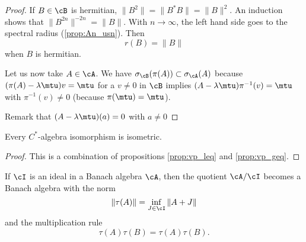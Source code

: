 \begin{proof}
If $B\in\cB$ is hermitian, $\|B^2\|=\|B^*B\|=\|B\|^2$. An induction shows that $\|B^{2n}\|^{-2n}=\|B\|$. With $n\to\infty$, the left hand side goes to the spectral radius (\ref{prop:An_usn}). Then 
\begin{equation}
r(B)=\|B\|
\end{equation}
when $B$ is hermitian.

Let us now take $A\in\cA$. We have $\sigma_{\cB}(\pi(A))\subset \sigma_{\cA}(A)$ because $(\pi(A)-\lambda\mtu)v=\mtu$ for a $v\neq 0$ in $\cB$ implies $(A-\lambda\mtu)\pi^{-1}(v)=\mtu$ with $\pi^{-1}(v)\neq 0$ (because $\pi(\mtu)=\mtu$).

Remark that $(A-\lambda\mtu)(a)=0$ with $a\neq 0$
\end{proof}

\begin{proposition}
    Every \( C^*\)-algebra isomorphism is isometric.
\end{proposition}

\begin{proof}
    This is a combination of propositions \ref{prop:vp_leq} and \ref{prop:vp_geq}.
\end{proof}

\begin{proposition} 
If $\cI$ is an ideal in a Banach algebra $\cA$, then the quotient $\cA/\cI$ becomes a Banach algebra with the norm
\begin{equation}  \label{eq:norm_ideal}
\|\tau(A)\|=\inf_{J\in\cI}\|A+J\|
\end{equation}
and the multiplication rule
\begin{equation}   \label{eq:prod_ideal}
\tau(A)\tau(B)=\tau(A)\tau(B).
\end{equation}
 \label{prop:ideal_Banach}
\end{proposition}

